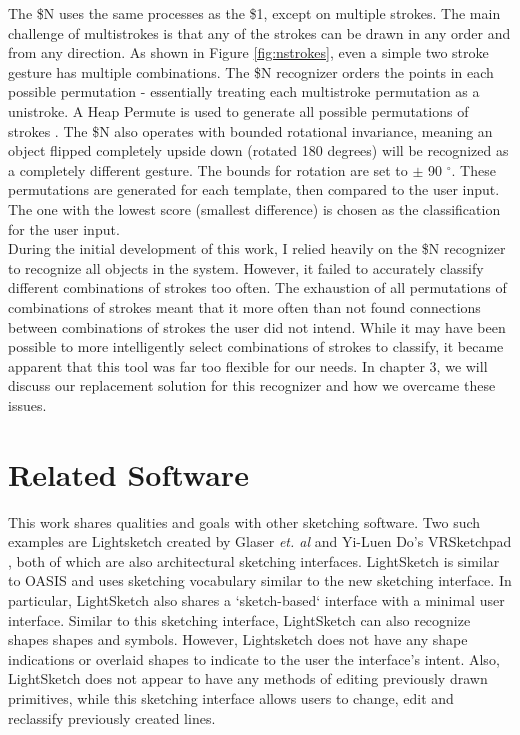 The \$N uses the same processes as the \$1, except on multiple strokes. The main challenge of multistrokes is that any of the strokes can be drawn in any order and from any direction. As shown in Figure \ref{fig:nstrokes}, even a simple two stroke gesture has multiple combinations. The \$N recognizer orders the points in each possible permutation - essentially treating each multistroke permutation as a unistroke. A Heap Permute is used to generate all possible permutations of strokes \cite{dollarN}. The \$N also operates with bounded rotational invariance, meaning an object flipped completely upside down (rotated 180 degrees) will be recognized as a completely different gesture. The bounds for rotation are set to $\pm$ 90 $^{\circ}$.  These permutations are generated for each template, then compared to the user input. The one with the lowest score (smallest difference) is chosen as the classification for the user input. \\

During the initial development of this work, I relied heavily on the \$N recognizer to recognize all objects in the system. However, it failed to accurately classify different combinations of strokes too often. The exhaustion of all permutations of combinations of strokes meant that it more often than not found connections between combinations of strokes the user did not intend. While it may have been possible to more intelligently select combinations of strokes to classify, it became apparent that this tool was far too flexible for our needs. In chapter 3, we will discuss our replacement solution for this recognizer and how we overcame these issues.

\section{Related Software}

This work shares qualities and goals with other sketching software. Two such examples are Lightsketch created by Glaser \textit{et. al} \cite{glaser2003sketch} and Yi-Luen Do's VRSketchpad \cite{do2001vr}, both of which are also architectural sketching interfaces. LightSketch is similar to OASIS and uses sketching vocabulary \cite{glaser2003sketch} similar to the new sketching interface. In particular, LightSketch also shares a `sketch-based` interface with a minimal user interface. Similar to this sketching interface, LightSketch can also recognize shapes shapes and symbols. However, Lightsketch does not have any shape indications or overlaid shapes to indicate to the user the interface's intent. Also, LightSketch does not appear to have any methods of editing previously drawn primitives, while this sketching interface allows users to change, edit and reclassify previously created lines. \\

